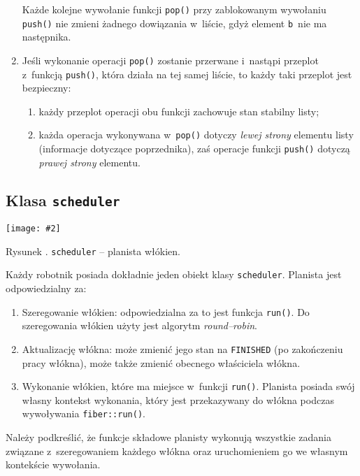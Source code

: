 \documentclass[12pt]{mwart}
\newcommand{\code}{\texttt}
\newcommand{\dcolon}{::}
\newcommand{\procbr}{()}
\newcommand{\function}[1]{\code{#1\procbr}}
\newcounter{figmain}
\newcommand{\myownfigure}[4]{ \newcounter{#1} \setcounter{#1}{\value{figmain}} \addtocounter{figmain}{1} \begin{center} \label{fig:#1} \centering \texttt{[image: \#2]}\\ \nopagebreak[5] \parbox[t]{11.5cm}{Rysunek \arabic{#1}. #3.} \end{center}}
\begin{document}
\begin{enumerate}
    Każde kolejne wywołanie funkcji \function{pop} przy zablokowanym wywołaniu \function{push}
    nie zmieni żadnego dowiązania w~liście, gdyż element \code{b}~nie ma następnika.
    \item Jeśli wykonanie operacji \function{pop} zostanie przerwane i~nastąpi przeplot z~funkcją \function{push}, która działa na tej samej liście,
    to każdy taki przeplot jest bezpieczny:
    \begin{enumerate}
      \item każdy przeplot operacji obu funkcji zachowuje stan stabilny listy;
      \item każda operacja wykonywana w~\function{pop} dotyczy \emph{lewej strony} elementu listy (informacje dotyczące poprzednika), zaś
      operacje funkcji \function{push} dotyczą \emph{prawej strony} elementu.
    \end{enumerate}
  \end{enumerate}
\par
%
\newpage
\subsection{Klasa \code{scheduler}}
\indent
\myownfigure{Scheduler}{Scheduler.png}{\code{scheduler} -- planista włókien}{.7}
\par
\indent
  Każdy robotnik posiada dokładnie jeden obiekt klasy \code{scheduler}. Planista jest odpowiedzialny za:
  \begin{enumerate}
    \item Szeregowanie włókien: odpowiedzialna za to jest funkcja \function{run}. Do szeregowania włókien użyty jest algorytm \emph{round--robin}.
    \item Aktualizację włókna: może zmienić jego stan na \code{FINISHED} (po zakończeniu pracy włókna), może także zmienić obecnego właściciela włókna.
    \item Wykonanie włókien, które ma miejsce w~funkcji \function{run}. Planista posiada swój własny kontekst wykonania, który jest przekazywany do włókna
      podczas wywoływania \function{fiber\dcolon run}.
  \end{enumerate}
  Należy podkreślić, że funkcje składowe planisty wykonują wszystkie zadania związane z~szeregowaniem każdego włókna oraz uruchomieniem go we własnym kontekście wywołania.
\par
%
\newpage
\end{document}
